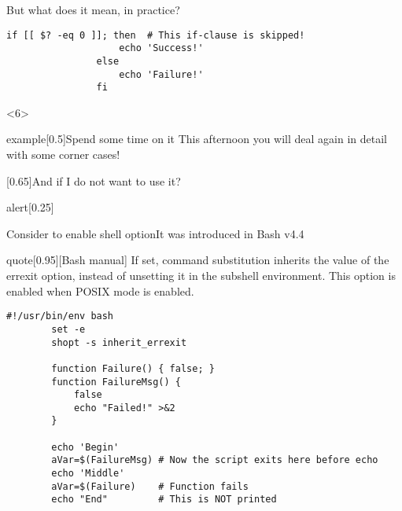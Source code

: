 \begin{frame}[fragile]{But what does it mean, in practice?}
\begin{overlayarea}{\textwidth}{0.7\textheight}
\begin{onlyenv}
\begin{lstlisting}[style=myBash]
                if [[ $? -eq 0 ]]; then  # This if-clause is skipped!
                    echo 'Success!'
                else
                    echo 'Failure!'
                fi
            \end{lstlisting}
        \end{onlyenv}
        \begin{onlyenv}<6>
            \large
            \begin{varblock}{example}[0.5\textwidth]{Spend some time on it}
                This afternoon you will deal again in detail with some corner cases!
            \end{varblock}
            \begin{varblock}{}[0.65\textwidth]{And if I do not want to use it?}
                \large {}
            \end{varblock}
            \vspace*{-1mm}
            \begin{varblock}{alert}[0.25\textwidth]{}
            \end{varblock}
        \end{onlyenv}
    \end{overlayarea}
\end{frame}
\begin{frame}[fragile]{Consider to enable \;\; shell option}{It was introduced in Bash v4.4}
    \vspace{-3mm}
    \begin{varblock}{quote}[0.95\textwidth]{}[Bash manual]
        If set, command substitution inherits the value of the errexit option, instead of unsetting it in the subshell environment.
        This option is enabled when POSIX mode is enabled.
    \end{varblock}
    \begin{lstlisting}[style=myBash]
        #!/usr/bin/env bash
        set -e
        shopt -s inherit_errexit

        function Failure() { false; }
        function FailureMsg() {
            false
            echo "Failed!" >&2
        }

        echo 'Begin'
        aVar=$(FailureMsg) # Now the script exits here before echo
        echo 'Middle'
        aVar=$(Failure)    # Function fails
        echo "End"         # This is NOT printed
    \end{lstlisting}
\end{frame}
